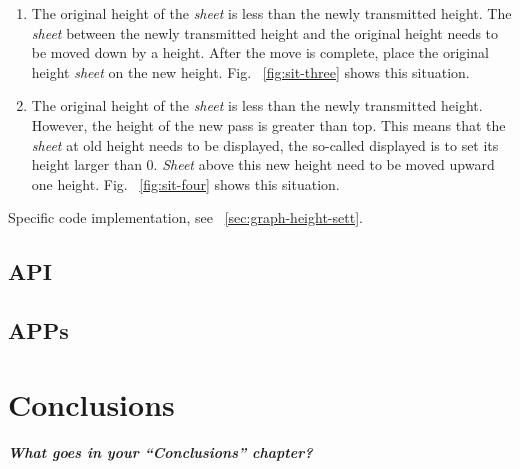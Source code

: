 \documentclass{swfcthesis}
\begin{document}
\begin{enumerate}
\item The original height of the \emph{sheet} is less than the newly transmitted
  height. The \emph{sheet} between the newly transmitted height and the original height
  needs to be moved down by a height. After the move is complete, place the original
  height \emph{sheet} on the new height. Fig. ~\ref{fig:sit-three} shows this situation.


\item The original height of the \emph{sheet} is less than the newly transmitted
  height. However, the height of the new pass is greater than top. This means that the
  \emph{sheet} at old height needs to be displayed, the so-called displayed is to set its height
  larger than 0. \emph{Sheet} above this new height need to be moved upward one
  height. Fig. ~\ref{fig:sit-four} shows this situation.
        
\end{enumerate}
Specific code implementation, see ~\ref{sec:graph-height-sett}.





\section{API}
\label{sec:API}


\section{APPs}
\label{sec:apps}




\chapter{Conclusions}%


\paragraph{What goes in your ``Conclusions'' chapter?}
\end{document}
